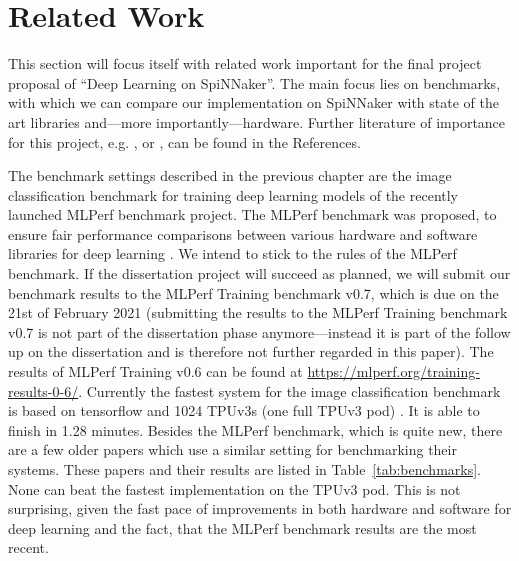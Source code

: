 \documentclass{article}
\begin{document}

\section{Related Work} %
\label{sec:related_work}

This section will focus itself with related work important
for the final project proposal of ``Deep Learning on
SpiNNaker''.
The main focus lies on benchmarks, with which we can
compare our implementation on SpiNNaker with state of the
art libraries and---more importantly---hardware.
Further literature of importance for this project, e.g.
\citet{he_et_al_2015}, \citet{goodfellow2016} or
\citet{imagenet}, can be found in the References.

The benchmark settings described in the previous chapter
are the image classification benchmark for training deep
learning models of the recently launched MLPerf benchmark
project.
The MLPerf benchmark was proposed, to ensure fair
performance comparisons between various hardware and
software libraries for deep learning
\citep{mattson_et_al_2019}.
We intend to stick to the rules of the MLPerf benchmark.
If the dissertation project will succeed as planned, we
will submit our benchmark results to the MLPerf Training
benchmark v0.7, which is due on the 21st of February 2021
(submitting the results to the MLPerf Training benchmark
v0.7 is not part of the dissertation phase
anymore---instead it is part of the follow up on the
dissertation and is therefore not further regarded in this
paper).
The results of MLPerf Training v0.6 can be found at
\url{https://mlperf.org/training-results-0-6/}.
Currently the fastest system for the image classification
benchmark is based on tensorflow and 1024 TPUv3s (one full
TPUv3 pod) \citep{stone2019}.
It is able to finish in 1.28 minutes.
Besides the MLPerf benchmark, which is quite new, there
are a few older papers which use a similar setting for
benchmarking their systems.
These papers and their results are listed in
Table~\ref{tab:benchmarks}.
None can beat the fastest implementation on the TPUv3 pod.
This is not surprising, given the fast pace of improvements in both
hardware and software for deep learning and the fact, that the
MLPerf benchmark results are the most recent.
\end{document}
